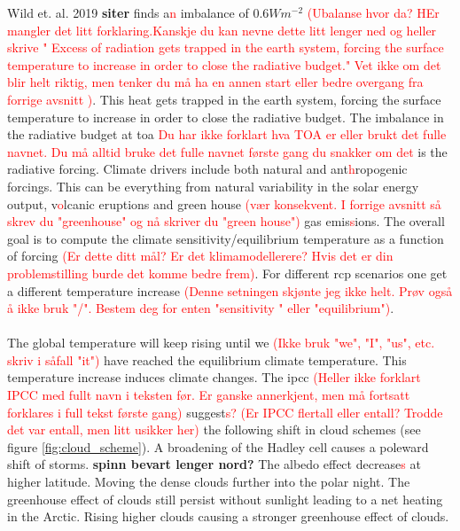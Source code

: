 Wild et. al. 2019  \textbf{siter} finds a\textcolor{red}{n} imbalance of $0.6W m^{-2}$ \textcolor{red}{(Ubalanse hvor da? HEr mangler det litt forklaring.Kanskje du kan nevne dette litt lenger ned og heller skrive " Excess of radiation gets trapped in the earth system, forcing the surface temperature to increase in order to close the radiative budget." Vet ikke om det blir helt riktig, men tenker du må ha en annen start eller bedre overgang fra forrige avsnitt )}. This heat gets trapped in the earth system, forcing the surface temperature to increase in order to close the radiative budget. The imbalance in the radiative budget at \acrshort{toa} \textcolor{red}{Du har ikke forklart hva TOA er eller brukt det fulle navnet. Du må alltid bruke det fulle navnet første gang du snakker om det} is the radiative forcing. Climate drivers include both natural and ant\textcolor{red}{h}ropogenic forcings. This can be everything from natural variability in the solar energy output, v\textcolor{red}{o}lcanic eruptions and green house \textcolor{red}{(vær konsekvent. I forrige avsnitt så skrev du "greenhouse" og nå skriver du "green house")} gas emis\textcolor{red}{s}ions. The overall goal is to compute the climate sensitivity/equilibrium temperature as a function of forcing \textcolor{red}{(Er dette ditt mål? Er det klimamodellerere? Hvis det er din problemstilling burde det komme bedre frem)}. For different \acrfull{rcp} scenarios one get a different temperature increase \textcolor{red}{(Denne setningen skjønte jeg ikke helt. Prøv også å ikke bruk "/". Bestem deg for enten "sensitivity " eller "equilibrium")}.
\\ \\ 
The global temperature will keep rising until we \textcolor{red}{(Ikke bruk "we", "I", "us", etc. skriv i såfall "it")} have reached the equilibrium climate temperature. This temperature increase induces climate changes. The \acrshort{ipcc} \textcolor{red}{(Heller ikke forklart IPCC med fullt navn i teksten før. Er ganske annerkjent, men må fortsatt forklares i full tekst første gang)} suggest\textcolor{red}{s? (Er IPCC flertall eller entall? Trodde det var entall, men litt usikker her)} the following shift in cloud schemes (see figure \ref{fig:cloud_scheme}). A broadening of the Hadley cell causes a poleward shift of storms. \textbf{spinn bevart lenger nord?} The albedo effect decrease\textcolor{red}{s} at higher latitude. Moving the dense clouds further into the polar night. %
The greenhouse effect of clouds still persist without sunlight leading to a net heating in the Arctic. Rising higher clouds causing a stronger greenhouse effect of clouds.
